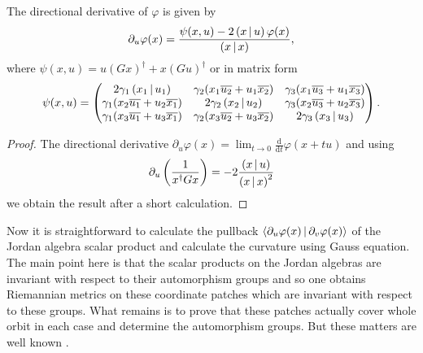 \begin{lemma}
The  directional derivative of $\varphi$ is given by 
\[
\partial_u \varphi(x) = \frac{\psi(x,u) - 2\left( x \,|\, u \right)\varphi(x)}{\left( x \,|\, x \right)},
\]
where $\psi(x,u) = u(Gx)^\dagger + x(Gu)^\dagger$ or in matrix form
\[
\psi(x,u) =
\begin{pmatrix}
2\gamma_1\left( x_1 \,|\, u_1 \right) & \gamma_2(x_1\overline{u_2} + u_1\overline{x_2}) & \gamma_3(x_1\overline{u_3} + u_1\overline{x_3})  \\
\gamma_1(x_2\overline{u_1} + u_2\overline{x_1}) & 2\gamma_2\left( x_2 \,|\, u_2 \right) & \gamma_3(x_2\overline{u_3} + u_2\overline{x_3})  \\
\gamma_1(x_3\overline{u_1} + u_3\overline{x_1}) & \gamma_2(x_3\overline{u_2} + u_3\overline{x_2}) & 2\gamma_3\left( x_3 \,|\, u_3 \right)
\end{pmatrix}.
\]
\end{lemma}
\begin{proof}
The directional derivative $\partial_u \varphi(x) = \lim_{t\to 0} \frac{\mathrm{d}}{\mathrm{d}t} \varphi(x+tu)$ and using  
\[
\partial_u \left( \frac{1}{x^\dagger G x} \right) = - 2\frac{\left( x \,|\, u \right)}{\left( x \,|\, x \right)^2}
\]
we obtain the result after a short calculation.
\end{proof}

Now it is straightforward to calculate the pullback $\langle \partial_u \varphi(x)\,|\, \partial_v \varphi(x) \rangle$ of the Jordan algebra scalar product  and calculate the curvature using Gauss equation. The main point here is that the scalar products on the Jordan algebras are invariant with respect to their automorphism groups and so one obtains Riemannian metrics on these coordinate patches which are invariant with respect to these groups. What remains is to prove that these patches actually cover whole orbit in each case and determine the automorphism groups. But these matters are well known \cite{springer_octonions_2000, shukuzawa_orbit_2003}.

